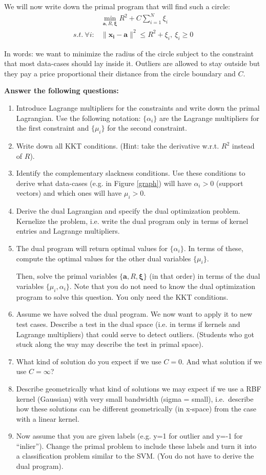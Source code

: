 \documentclass[12pt,a4paper]{article}
\begin{document}
We will now write down the primal program that will find such a circle:
\begin{align*}
&\min_{\boldsymbol{a},R,\boldsymbol{\xi}} R^2+C \sum_{i=1}^N \xi_i\\
s.t.~\forall i : &\| \boldsymbol{x_i} - \boldsymbol{a} \|^2 \le R^2 + \xi_i,~\xi_i \ge 0
\end{align*}

In words: we want to minimize the radius of the circle subject to the constraint that most data-cases should lay inside it. Outliers are allowed to stay outside but they pay a price proportional their distance from the circle boundary and $C$.

{\bf Answer the following questions:}

\begin{enumerate}
\item Introduce Lagrange multipliers for the constraints and write down the primal Lagrangian. Use the following notation: $\{\alpha_i\}$ are the Lagrange multipliers for the first constraint and $\{\mu_i\}$ for the second constraint.
\item Write down all KKT conditions. (Hint: take the derivative w.r.t. $R^2$ instead of $R$).
\item Identify the complementary slackness conditions. Use these conditions to derive what data-cases (e.g. in Figure \ref{graph}) will have $\alpha_i>0$ (support vectors) and which ones will have $\mu_i>0$.
\item Derive the dual Lagrangian and specify the dual optimization problem.
Kernelize the problem, i.e. write the dual program only in terms of kernel entries and Lagrange multipliers.
\item The dual program will return optimal values for $\{\alpha_i\}$. In terms of these, compute the optimal values for the other dual variables $\{\mu_i\}$.

Then, solve the primal variables $\{\boldsymbol{a},R,\boldsymbol{\xi} \}$ (in that order) in terms of the dual variables $\{\mu_i,\alpha_i\}$. Note that you do not need to know the dual optimization program to solve this question. You only need the KKT conditions. 
\item Assume we have solved the dual program. We now want to apply it to new test cases. Describe a test in the dual space (i.e. in terms if kernels and Lagrange multipliers) that could serve to detect outliers. (Students who got stuck along the way may describe the test in primal space).
\item What kind of solution do you expect if we use $C=0$. And what solution if we use $C=\infty$?
\item Describe geometrically what kind of solutions we may expect if we use a RBF kernel (Gaussian) with very small bandwidth (sigma = small), i.e.~describe how these solutions can be different geometrically (in x-space) from the case with a linear kernel.
\item Now assume that you are given labels (e.g. y=1 for outlier and y=-1 for ``inlier'').  Change the primal problem to include these labels and turn it into a classification problem similar to the SVM. (You do not have to derive the dual program).
\end{enumerate}
\end{document}
